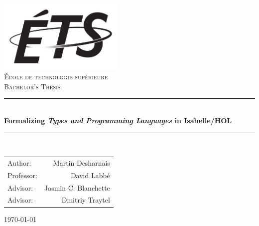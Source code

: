 \documentclass[12pt,a4paper,titlepage,oneside]{article}
\newcommand{\HRule}{\rule{\linewidth}{0.5mm}}
\begin{document}
\pagestyle{empty}


\begin{titlepage}
  \begin{center}
    \includegraphics[width=6cm]{./logo-ETS.png}~\\[1cm]

    \textsc{\LARGE École de technologie supérieure}\\[1.5cm]
    \textsc{\Large Bachelor's Thesis}\\[0.5cm]

    \HRule \\[0.4cm]
    { \huge \bfseries Formalizing \emph{Types and Programming Languages} in Isabelle/HOL \\[0.4cm] }

    \HRule \\[1.5cm]

    \begin{center}
      \begin{tabular}{lr}
        Author:    & Martin Desharnais \\
        Professor: & David Labbé \\
        Advisor:   & Jasmin C. Blanchette \\
        Advisor:   & Dmitriy Traytel
      \end{tabular}
    \end{center}

    \vfill

    {\large \today}

  \end{center}
\end{titlepage}

\newpage
\null
\newpage
{}
\end{document}
